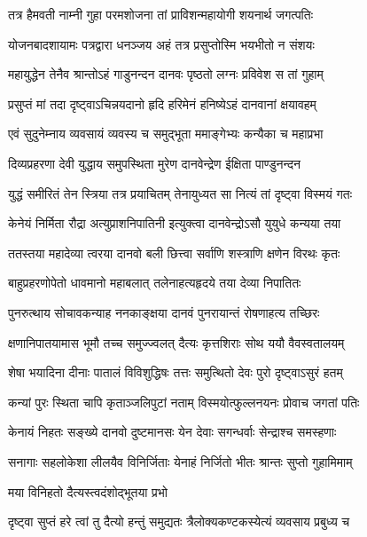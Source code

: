 \twolineshloka
{तत्र हैमवती नाम्नी गुहा परमशोजना}
{तां प्राविशन्महायोगी शयनार्थ जगत्पतिः} %

\twolineshloka
{योजनबादशायामः पत्रद्वारा धनञ्जय}
{अहं तत्र प्रसुप्तोस्मि भयभीतो न संशयः} %

\twolineshloka
{महायुद्धेन तेनैव श्रान्तोऽहं गाडुनन्दन}
{दानवः पृष्ठतो लग्नः प्रविवेश स तां गुहाम्} %

\twolineshloka
{प्रसुप्तं मां तदा दृष्ट्वाऽचिन्नयदानो हृदि}
{हरिमेनं हनिष्येऽहं दानवानां क्षयावहम्} %

\twolineshloka
{एवं सुदुनेम्नाय व्यवसायं व्यवस्य च}
{समुद्भूता ममाङ्गेभ्यः कन्यैका च महाप्रभा} %

\twolineshloka
{दिव्यप्रहरणा देवी युद्धाय समुपस्थिता}
{मुरेण दानवेन्द्रेण ईक्षिता पाण्डुनन्दन} %

\twolineshloka
{युद्धं समीरितं तेन स्त्रिया तत्र प्रयाचितम्}
{तेनायुध्यत सा नित्यं तां दृष्ट्वा विस्मयं गतः} %

\twolineshloka
{केनेयं निर्मिता रौद्रा अत्युप्राशनिपातिनी}
{इत्युक्त्वा दानवेन्द्रोऽसौ युयुधे कन्यया तया} %

\twolineshloka
{ततस्तया महादेव्या त्वरया दानवो बली}
{छित्त्वा सर्वाणि शस्त्राणि क्षणेन विरथः कृतः} %

\twolineshloka
{बाहुप्रहरणोपेतो धावमानो महाबलात्}
{तलेनाहत्यहृदये तया देव्या निपातितः} %

\twolineshloka
{पुनरुत्थाय सोचावकन्याह ननकाङ्क्षया}
{दानवं पुनरायान्तं रोषणाहत्य तच्छिरः} %

\twolineshloka
{क्षणानिपातयामास भूमौ तच्च समुज्ज्वलत्}
{दैत्यः कृत्तशिराः सोथ ययौ वैवस्वतालयम्} %

\twolineshloka
{शेषा भयादिना दीनाः पातालं विविशुद्धिषः}
{तत्तः समुत्थितो देवः पुरो दृष्ट्वाऽसुरं हतम्} %

\twolineshloka
{कन्यां पुरः स्थिता चापि कृताञ्जलिपुटां नताम्}
{विस्मयोत्फुल्लनयनः प्रोवाच जगतां पतिः} %

\twolineshloka
{केनायं निहतः सङ्ख्ये दानवो दुष्टमानसः}
{येन देवाः सगन्धर्वाः सेन्द्राश्च समस्हणाः} %

\twolineshloka
{सनागाः सहलोकेशा लीलयैव विनिर्जिताः}
{येनाहं निर्जितो भीतः श्रान्तः सुप्तो गुहामिमाम्} %



\onelineshloka
{मया विनिहतो दैत्यस्त्वदंशोद्भूतया प्रभो} %

\twolineshloka
{दृष्ट्वा सुप्तं हरे त्वां तु दैत्यो हन्तुं समुद्यतः}
{त्रैलोक्यकण्टकस्येत्यं व्यवसाय प्रबुध्य च} %

